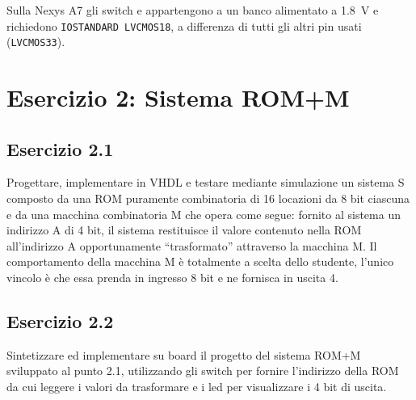 

\begin{attenzione}[Switch 8 e 9]
	Sulla Nexys A7 gli switch  e  appartengono a un banco alimentato a
	\SI{1.8}{\volt} e richiedono \texttt{IOSTANDARD LVCMOS18}, a differenza di tutti gli altri
	pin usati (\texttt{LVCMOS33}).
\end{attenzione}


\section{Esercizio 2: Sistema ROM+M}

\subsection{Esercizio 2.1}

\begin{traccia}
	Progettare, implementare in VHDL e testare mediante simulazione un sistema S composto da
	una ROM puramente combinatoria di 16 locazioni da 8 bit ciascuna e da una macchina
	combinatoria M che opera come segue: fornito al sistema un indirizzo A di 4 bit, il
	sistema restituisce il valore contenuto nella ROM all'indirizzo A opportunamente
	``trasformato'' attraverso la macchina M. Il comportamento della macchina M è totalmente
	a scelta dello studente, l'unico vincolo è che essa prenda in ingresso 8 bit e ne
	fornisca in uscita 4.
\end{traccia}

\progetto
{}

\implementazione
{}

\simulazione
{}

\subsection{Esercizio 2.2}

\begin{traccia}
	Sintetizzare ed implementare su board il progetto del sistema ROM+M sviluppato al punto
	2.1, utilizzando gli switch per fornire l'indirizzo della ROM da cui leggere i valori da
	trasformare e i led per visualizzare i 4 bit di uscita.
\end{traccia}

\sintesiboard
{}
